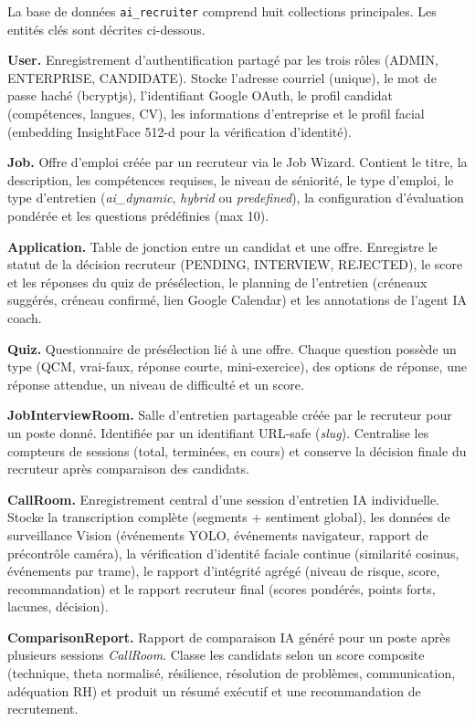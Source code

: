 La base de données \texttt{ai\_recruiter} comprend huit collections principales. Les entités
clés sont décrites ci-dessous.

\noindent\textbf{User.} Enregistrement d'authentification partagé par les trois rôles
(ADMIN, ENTERPRISE, CANDIDATE). Stocke l'adresse courriel (unique), le mot de passe haché
(bcryptjs), l'identifiant Google OAuth, le profil candidat (compétences, langues, CV),
les informations d'entreprise et le profil facial (embedding InsightFace 512-d pour la
vérification d'identité).

\noindent\textbf{Job.} Offre d'emploi créée par un recruteur via le Job Wizard. Contient
le titre, la description, les compétences requises, le niveau de séniorité, le type
d'emploi, le type d'entretien (\textit{ai\_dynamic}, \textit{hybrid} ou
\textit{predefined}), la configuration d'évaluation pondérée et les questions prédéfinies
(max 10).

\noindent\textbf{Application.} Table de jonction entre un candidat et une offre. Enregistre
le statut de la décision recruteur (PENDING, INTERVIEW, REJECTED), le score et les réponses
du quiz de présélection, le planning de l'entretien (créneaux suggérés, créneau confirmé,
lien Google Calendar) et les annotations de l'agent IA coach.

\noindent\textbf{Quiz.} Questionnaire de présélection lié à une offre. Chaque question
possède un type (QCM, vrai-faux, réponse courte, mini-exercice), des options de réponse,
une réponse attendue, un niveau de difficulté et un score.

\noindent\textbf{JobInterviewRoom.} Salle d'entretien partageable créée par le recruteur
pour un poste donné. Identifiée par un identifiant URL-safe (\textit{slug}). Centralise les
compteurs de sessions (total, terminées, en cours) et conserve la décision finale du
recruteur après comparaison des candidats.

\noindent\textbf{CallRoom.} Enregistrement central d'une session d'entretien IA individuelle.
Stocke la transcription complète (segments + sentiment global), les données de surveillance
Vision (événements YOLO, événements navigateur, rapport de précontrôle caméra), la
vérification d'identité faciale continue (similarité cosinus, événements par trame), le
rapport d'intégrité agrégé (niveau de risque, score, recommandation) et le rapport recruteur
final (scores pondérés, points forts, lacunes, décision).

\noindent\textbf{ComparisonReport.} Rapport de comparaison IA généré pour un poste après
plusieurs sessions \textit{CallRoom}. Classe les candidats selon un score composite
(technique, theta normalisé, résilience, résolution de problèmes, communication, adéquation
RH) et produit un résumé exécutif et une recommandation de recrutement.

